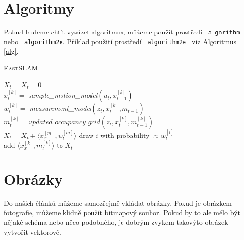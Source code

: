 \documentclass[11pt, titlepage, a4paper]{article}
\begin{document}

		  \newpage

		\section{Algoritmy}
      \label{sec:alg}
			Pokud budeme chtít vysázet algoritmus, můžeme použít prostředí \texttt{ algorithm}
			\footnotemark[2]  nebo \texttt{ algorithm2e}\footnotemark[3].
			Příklad použití prostředí \texttt{ algorithm2e } viz Algoritmus \ref{alg}.

		  \begin{algorithm}[h]
		  \caption{\textsc{Fast}SLAM}
		  \label{alg}
		  \SetNlSty{}{}{:  } %
		  \SetInd{1em}{1em}
		  \SetNlSkip{-1.33em}

		  \BlankLine
		  \Indp \Indp
      $\overline{X_t} = X_t = 0$\\
      {
      		$x_t^{[k]} =$ \emph{sample\_motion\_model}$(u_t,x_{t-1}^{[k]})$\\
      		$w_t^{[k]} =$ \emph{measurement\_model}$(z_t,x_t^{[k]},m_{t-1})$\\
      		$m_t^{[k]} = updated\_occupancy\_grid(z_t,x_t^{[k]},m_{t-1}^{[k]})$\\
      		$\overline{X_t} = \overline{X_t} + \langle x_x^{[m]},w_t^{[m]}\rangle$
      }
      {
      		draw $i$ with probability $\approx w_t^{[i]}$\\
      		add $\langle x_x^{[k]},m_t^{[k]}\rangle$ to $X_t$\\
      }
		  \end{algorithm}


		\section{Obrázky}
			Do našich článků můžeme samozřejmě vkládat obrázky. Pokud je obrázkem fotografie,
			můžeme klidně použít bitmapový soubor. Pokud by to ale mělo být nějaké schéma nebo
			něco podobného, je dobrým zvykem takovýto obrázek vytvořit vektorově.
\end{document}
